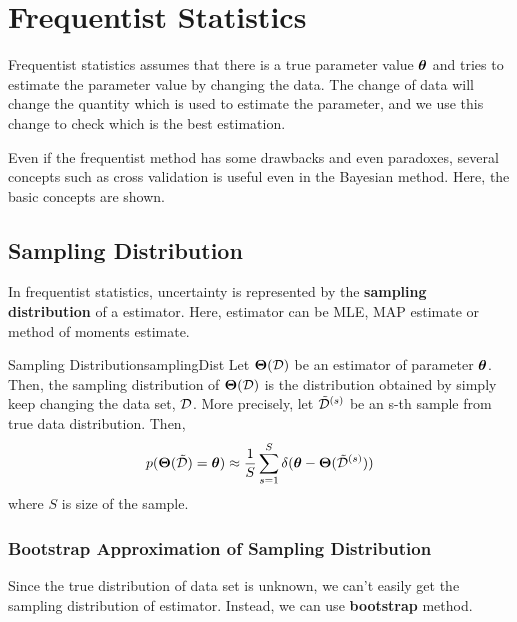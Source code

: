 \documentclass{report}
\begin{document}
    \section{Frequentist Statistics}
    Frequentist statistics assumes that there is a true parameter value $\boldsymbol{\theta}$ and tries to estimate the parameter value
    by changing the data.
    The change of data will change the quantity which is used to estimate the parameter,
    and we use this change to check which is the best estimation.

    Even if the frequentist method has some drawbacks and even paradoxes, several concepts such as
    cross validation is useful even in the Bayesian method. Here, the basic concepts are shown.

        \subsection{Sampling Distribution}
            In frequentist statistics, uncertainty is represented by the \textbf{sampling distribution}
            of a estimator. Here, estimator can be MLE, MAP estimate or method of moments estimate.
            \begin{defn}{Sampling Distribution}{samplingDist}
                Let $\boldsymbol{\Theta}(\mathcal D)$ be an estimator of parameter $\boldsymbol{\theta}$.
                Then, the sampling distribution of $\boldsymbol{\Theta}(\mathcal D)$ is the distribution obtained by simply keep changing the data set, $\mathcal D$.
                More precisely, let $\tilde{\mathcal D}^{(s)}$ be an s-th sample from true data distribution. Then,
                \[
                p(\boldsymbol{\Theta}(\tilde{\mathcal D})=\boldsymbol{\theta}) \approx \frac{1}{S}\sum_{s=1}^{S}\delta(\boldsymbol{\theta}-\boldsymbol{\Theta}(\tilde{\mathcal D}^{(s)}))
                \]
                where $S$ is size of the sample.
            \end{defn}

            \subsubsection{Bootstrap Approximation of Sampling Distribution}
                Since the true distribution of data set is unknown, we can't easily get the sampling distribution of estimator.
                Instead, we can use \textbf{bootstrap} method.
\end{document}
